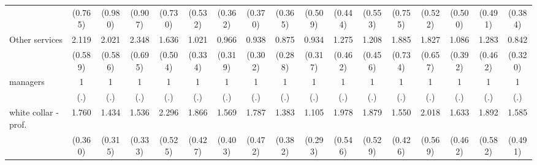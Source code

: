 {\begin{tabular}{l*{16}{c}}
                    &     (0.765)         &     (0.980)         &     (0.907)         &     (0.730)         &     (0.532)         &     (0.362)         &     (0.370)         &     (0.365)         &     (0.509)         &     (0.444)         &     (0.553)         &     (0.755)         &     (0.522)         &     (0.500)         &     (0.491)         &     (0.384)         \\
[1em]
Other services      &       2.119\sym{**} &       2.021\sym{*}  &       2.348\sym{**} &       1.636         &       1.021         &       0.966         &       0.938         &       0.875         &       0.934         &       1.275         &       1.208         &       1.885         &       1.827         &       1.086         &       1.283         &       0.842         \\
                    &     (0.589)         &     (0.586)         &     (0.695)         &     (0.504)         &     (0.334)         &     (0.319)         &     (0.302)         &     (0.288)         &     (0.317)         &     (0.462)         &     (0.456)         &     (0.734)         &     (0.657)         &     (0.392)         &     (0.462)         &     (0.320)         \\
[1em]
managers            &           1         &           1         &           1         &           1         &           1         &           1         &           1         &           1         &           1         &           1         &           1         &           1         &           1         &           1         &           1         &           1         \\
                    &         (.)         &         (.)         &         (.)         &         (.)         &         (.)         &         (.)         &         (.)         &         (.)         &         (.)         &         (.)         &         (.)         &         (.)         &         (.)         &         (.)         &         (.)         &         (.)         \\
[1em]
white collar - prof.&       1.760\sym{**} &       1.434         &       1.536\sym{*}  &       2.296\sym{***}&       1.866\sym{**} &       1.569         &       1.787\sym{*}  &       1.383         &       1.105         &       1.978\sym{*}  &       1.879\sym{*}  &       1.550         &       2.018\sym{*}  &       1.633         &       1.892\sym{*}  &       1.585         \\
                    &     (0.360)         &     (0.315)         &     (0.333)         &     (0.525)         &     (0.427)         &     (0.403)         &     (0.472)         &     (0.382)         &     (0.293)         &     (0.546)         &     (0.529)         &     (0.426)         &     (0.569)         &     (0.462)         &     (0.582)         &     (0.491)         \\

\end{tabular}}

